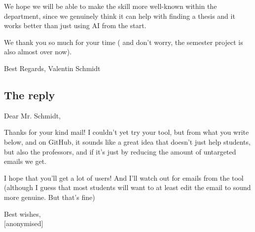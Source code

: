 \documentclass[11pt,a4paper]{article}
\begin{document}
\medskip
\noindent We hope we will be able to make the skill more well-known within the
department, since we genuinely think it can help with finding a thesis and it
works better than just using AI from the start.

\medskip
\noindent We thank you so much for your time ( and don't worry, the semester
project is also almost over now).

\medskip
\noindent Best Regards, Valentin Schmidt

\subsection*{The reply}

\noindent Dear Mr. Schmidt,

\medskip
\noindent Thanks for your kind mail! I couldn't yet try your tool, but from what
you write below, and on GitHub, it sounds like a great idea that doesn't just help
students, but also the professors, and if it's just by reducing the amount of
untargeted emails we get.

\medskip
\noindent I hope that you'll get a lot of users! And I'll watch out for emails
from the tool (although I guess that most students will want to at least edit
the email to sound more genuine. But that's fine)

\medskip
\noindent Best wishes,\\
{[anonymised]}
\end{document}
